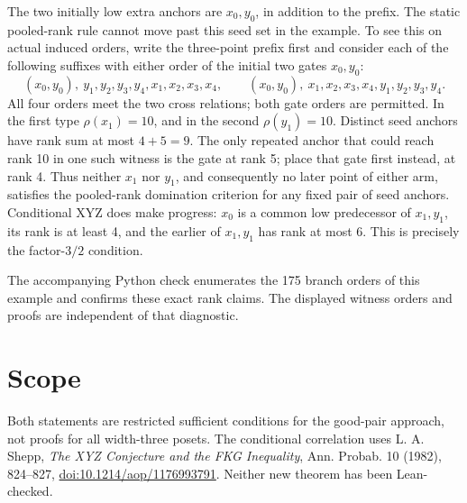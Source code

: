 \documentclass[10pt,letterpaper]{article}
\begin{document}
The two initially low extra anchors are \(x_0,y_0\), in addition to the
prefix. The static pooled-rank rule cannot move past this seed set in
the example. To see this on actual induced orders, write the three-point
prefix first and consider each of the following suffixes with either
order of the initial two gates \(x_0,y_0\): \[
  (x_0,y_0),\ y_1,y_2,y_3,y_4,x_1,x_2,x_3,x_4,
  \qquad
  (x_0,y_0),\ x_1,x_2,x_3,x_4,y_1,y_2,y_3,y_4 .
\] All four orders meet the two cross relations; both gate orders are
permitted. In the first type \(\rho(x_1)=10\), and in the second
\(\rho(y_1)=10\). Distinct seed anchors have rank sum at most \(4+5=9\).
The only repeated anchor that could reach rank 10 in one such witness is
the gate at rank 5; place that gate first instead, at rank 4. Thus
neither \(x_1\) nor \(y_1\), and consequently no later point of either
arm, satisfies the pooled-rank domination criterion for any fixed pair
of seed anchors. Conditional XYZ does make progress: \(x_0\) is a common
low predecessor of \(x_1,y_1\), its rank is at least 4, and the earlier
of \(x_1,y_1\) has rank at most 6. This is precisely the factor-\(3/2\)
condition.

The accompanying Python check enumerates the 175 branch orders of this
example and confirms these exact rank claims. The displayed witness
orders and proofs are independent of that diagnostic.

\section{Scope}\label{scope}

Both statements are restricted sufficient conditions for the good-pair
approach, not proofs for all width-three posets. The conditional
correlation uses L. A. Shepp, \emph{The XYZ Conjecture and the FKG
Inequality}, Ann. Probab. 10 (1982), 824--827,
\href{https://doi.org/10.1214/aop/1176993791}{doi:10.1214/aop/1176993791}.
Neither new theorem has been Lean-checked.
\end{document}

